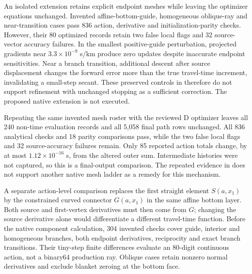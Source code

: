 An isolated extension retains explicit endpoint meshes while leaving the
optimizer equations unchanged. Invented affine-bottom-guide, homogeneous
oblique-ray and near-transition cases pass 836 action, derivative and
initialization-parity checks. However, their 80 optimized records retain
two false local flags and 32 source-vector accuracy failures. In the smallest
positive-guide perturbation, projected gradients near $3.3\times10^{-9}$ s/km
produce zero updates despite inaccurate endpoint sensitivities. Near a branch
transition, additional descent after source displacement changes the forward
error more than the true travel-time increment, invalidating a small-step
secant. These preserved controls in
 therefore
do not support refinement with unchanged stopping as a sufficient correction.
The proposed native extension is not executed.

Repeating the same invented mesh roster with the reviewed D optimizer leaves
all 240 non-time evaluation records and all 5,058 final path rows unchanged.
All 836 analytical checks and 18 parity comparisons pass, while the two false
local flags and 32 source-accuracy failures remain. Only 85 reported action
totals change, by at most $1.12\times10^{-16}$ s, from the altered outer sum.
Intermediate histories were not captured, so this is a final-output comparison.
The repeated evidence in
does not support another native mesh ladder as a remedy for this mechanism.

A separate action-level comparison replaces the first straight element
$S(a,x_1)$ by the constrained curved connector $G(a,x_1)$ in the same affine
bottom layer. Both source and first-vertex derivatives must then come from
$G$; changing the source derivative alone would differentiate a different
travel-time function. Before the native component calculation, 304 invented
checks cover guide, interior and homogeneous branches, both endpoint
derivatives, reciprocity and exact branch transitions. Their tiny-step
finite differences evaluate an 80-digit continuous action, not a binary64
production ray. Oblique cases retain nonzero normal derivatives and exclude
blanket zeroing at the bottom face.


